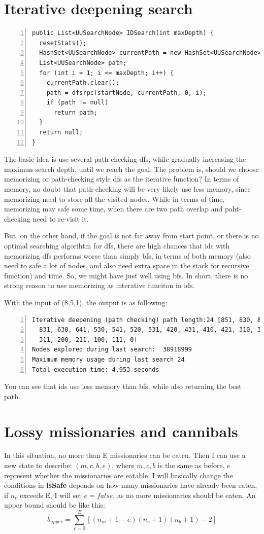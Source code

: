 \documentclass{article}
\begin{document}
\section{Iterative deepening search}

\begin{lstlisting}[numbers=left]
public List<UUSearchNode> IDSearch(int maxDepth) {
  resetStats();
  HashSet<UUSearchNode> currentPath = new HashSet<UUSearchNode>();
  List<UUSearchNode> path;
  for (int i = 1; i <= maxDepth; i++) {
    currentPath.clear();
    path = dfsrpc(startNode, currentPath, 0, i);
    if (path != null)
      return path;
  }
  return null;
}
\end{lstlisting}

The basic idea is use several path-checking dfs, while gradually increasing the maximun search depth, until we reach the goal. The problem is, should we choose memorizing or path-checking style dfs as the iterative function? In terms of memory, no doubt that path-checking will be very likely use less memory, since memorizing need to store all the visited nodes. While in terms of time, memorizing may safe some time, when there are two path overlap and paht-checking need to re-visit it. 

But, on the other hand, if the goal is not far away from start point, or there is no optimal searching algorihtm for dfs, there are high chances that ids with memorizing dfs performs worse than simply bfs, in terms of both memory (also need to safe a lot of nodes, and also need extra space in the stack for recursive function) and time. So, we might have just well using bfs. In short, there is no strong reason to use memorizing as interative funciton in ids.

With the input of (8,5,1), the output is as following:

\begin{lstlisting}[numbers=left]
Iterative deepening (path checking) path length:24 [851, 830, 841, 820,
  831, 630, 641, 530, 541, 520, 531, 420, 431, 410, 421, 310, 321, 300,
  311, 200, 211, 100, 111, 0]
Nodes explored during last search:  38918999
Maximum memory usage during last search 24
Total execution time: 4.953 seconds
\end{lstlisting}

You can see that ids use less memory than bfs, while also returning the best path.





\section{Lossy missionaries and cannibals}

In this situation, no more than E missionaries can be eaten. Then I can use a new state to describe: $(m, c, b, e)$, where $m, c, b$ is the same as before, $e$ represent whether the missionaries are eatable. I will basically change the conditions in \textbf{isSafe} depends on how many missionaries have already been eaten, if $n_e$ exceeds E, I will set $e = false$, as no more missionaries should be eaten. An upper bound should be like this:
$$b_{upper} = \sum_{e = 0}^E[(n_m + 1 - e)(n_c + 1)(n_b + 1) - 2]$$
\end{document}
